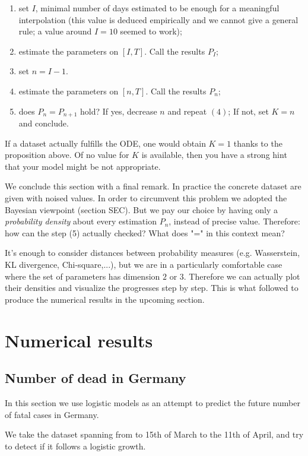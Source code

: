 \documentclass[9pt]{article}
\begin{document}
\begin{enumerate}
	\item set $I$, minimal number of days estimated to be enough
		for a meaningful interpolation
		(this value is deduced empirically and we cannot give
		a general rule; a value around $I = 10$ seemed to work);
	\item estimate the parameters on $[I, T]$. Call the results $P_I$;
	\item set $n = I - 1$.
	\item estimate the parameters on $[n, T]$. Call the results
		$P_n$;
	\item does $P_n = P_{n+1}$ hold? If yes, decrease $n$ and
		repeat $(4)$; If not, set $K = n$ and conclude.
\end{enumerate}


If a dataset actually fulfills the ODE, one would obtain $K = 1$ thanks
to the proposition above. Of no value for $K$ is available, then you have
a strong hint that your model might be not appropriate.


We conclude this section with a final remark. In practice the concrete
dataset are given with noised values. In order to circumvent this problem
we adopted the Bayesian viewpoint (section SEC). But we pay our choice
by having only a \emph{probability density} about every estimation
$P_n$, instead of precise value. Therefore: how can the step (5) actually
checked? What does "=" in this context mean?


It's enough to consider distances between probability measures
(e.g. Wasserstein, KL divergence, Chi-square,...), but we are in a
particularly comfortable case where the set of parameters has dimension
$2$ or $3$. Therefore we can actually plot their densities
and visualize the progresses step by step. This is what followed to
produce the numerical results in the upcoming section.

\section {Numerical results}

\subsection{Number of dead in Germany}
In this section we use logistic models as an attempt 
to predict the future number of
fatal cases in Germany. 


We take the dataset spanning from to 15th of March to the 11th of April,
and try to detect if it follows a logistic growth.
\end{document}
